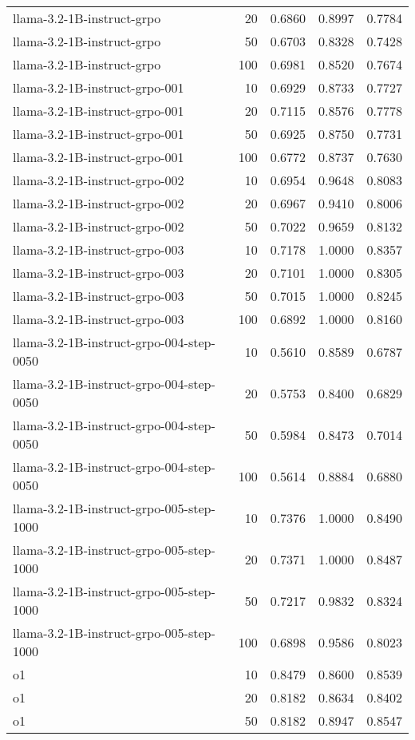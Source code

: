 \begin{tabular}{lrrrr}
llama-3.2-1B-instruct-grpo & 20 & 0.6860 & 0.8997 & 0.7784 \\
llama-3.2-1B-instruct-grpo & 50 & 0.6703 & 0.8328 & 0.7428 \\
llama-3.2-1B-instruct-grpo & 100 & 0.6981 & 0.8520 & 0.7674 \\
llama-3.2-1B-instruct-grpo-001 & 10 & 0.6929 & 0.8733 & 0.7727 \\
llama-3.2-1B-instruct-grpo-001 & 20 & 0.7115 & 0.8576 & 0.7778 \\
llama-3.2-1B-instruct-grpo-001 & 50 & 0.6925 & 0.8750 & 0.7731 \\
llama-3.2-1B-instruct-grpo-001 & 100 & 0.6772 & 0.8737 & 0.7630 \\
llama-3.2-1B-instruct-grpo-002 & 10 & 0.6954 & 0.9648 & 0.8083 \\
llama-3.2-1B-instruct-grpo-002 & 20 & 0.6967 & 0.9410 & 0.8006 \\
llama-3.2-1B-instruct-grpo-002 & 50 & 0.7022 & 0.9659 & 0.8132 \\
llama-3.2-1B-instruct-grpo-003 & 10 & 0.7178 & 1.0000 & 0.8357 \\
llama-3.2-1B-instruct-grpo-003 & 20 & 0.7101 & 1.0000 & 0.8305 \\
llama-3.2-1B-instruct-grpo-003 & 50 & 0.7015 & 1.0000 & 0.8245 \\
llama-3.2-1B-instruct-grpo-003 & 100 & 0.6892 & 1.0000 & 0.8160 \\
llama-3.2-1B-instruct-grpo-004-step-0050 & 10 & 0.5610 & 0.8589 & 0.6787 \\
llama-3.2-1B-instruct-grpo-004-step-0050 & 20 & 0.5753 & 0.8400 & 0.6829 \\
llama-3.2-1B-instruct-grpo-004-step-0050 & 50 & 0.5984 & 0.8473 & 0.7014 \\
llama-3.2-1B-instruct-grpo-004-step-0050 & 100 & 0.5614 & 0.8884 & 0.6880 \\
llama-3.2-1B-instruct-grpo-005-step-1000 & 10 & 0.7376 & 1.0000 & 0.8490 \\
llama-3.2-1B-instruct-grpo-005-step-1000 & 20 & 0.7371 & 1.0000 & 0.8487 \\
llama-3.2-1B-instruct-grpo-005-step-1000 & 50 & 0.7217 & 0.9832 & 0.8324 \\
llama-3.2-1B-instruct-grpo-005-step-1000 & 100 & 0.6898 & 0.9586 & 0.8023 \\
o1 & 10 & 0.8479 & 0.8600 & 0.8539 \\
o1 & 20 & 0.8182 & 0.8634 & 0.8402 \\
o1 & 50 & 0.8182 & 0.8947 & 0.8547 \\

\end{tabular}
